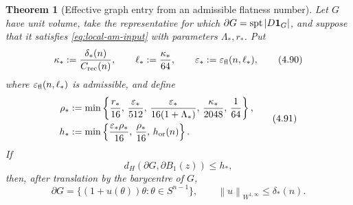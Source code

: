 \documentclass[11pt]{amsart}
\newtheorem{theorem}{Theorem}[section]
\theoremstyle{definition}
\newcommand{\norm}[1]{\left\|#1\right\|}
\begin{document}
\begin{theorem}[Effective graph entry from an admissible flatness number]
\label{thm:graph-entry-flat}
Let \(G\) have unit volume, take the representative for which
\(\partial G=\operatorname{spt}|D{\bf1}_G|\), and suppose that it
satisfies \eqref{eq:local-am-input} with parameters
\(\Lambda_*,r_*\).  Put
\[
   \kappa_*:=\frac{\delta_*(n)}{C_{\rm rec}(n)},\qquad
   \ell_*:=\frac{\kappa_*}{64},\qquad
   \varepsilon_*:=\varepsilon_{\rm fl}(n,\ell_*),
\tag{4.90}\label{eq:graph-target-data}
\]
where \(\varepsilon_{\rm fl}(n,\ell_*)\) is admissible, and define
\[
\begin{aligned}
   \rho_*&:=
     \min\left\{\frac{r_*}{16},\,
       \frac{\varepsilon_*}{512},\,
       \frac{\varepsilon_*}{16(1+\Lambda_*)},\,
       \frac{\kappa_*}{2048},\,\frac1{64}\right\},\\
   h_*&:=
     \min\left\{\frac{\varepsilon_*\rho_*}{16},\,
       \frac{\rho_*}{16},\,
       h_{\rm or}(n)\right\}.
\end{aligned}
\tag{4.91}\label{eq:graph-entry-constants}
\]
If
\[
   d_H(\partial G,\partial B_1(z))\le h_*,
\tag{4.92}\label{eq:graph-entry-H}
\]
then, after translation by the barycentre of \(G\),
\[
   \partial G
    =\{(1+u(\theta))\theta:\theta\in S^{n-1}\},
   \qquad
   \norm{u}_{W^{1,\infty}}\le\delta_*(n).
\tag{4.93}\label{eq:graph-entry-result}
\]
\end{theorem}
\end{document}
